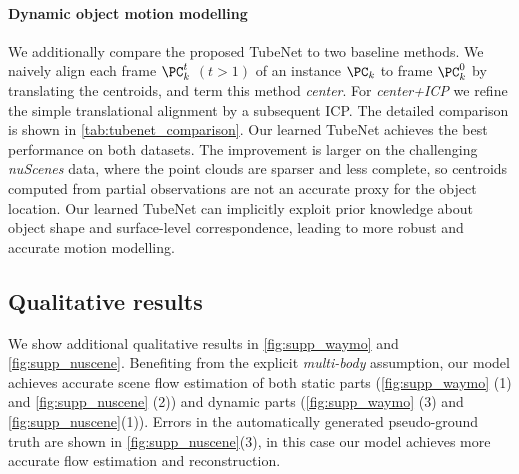 \paragraph{Dynamic object motion modelling}

We additionally compare the proposed TubeNet to two baseline methods. We naively align each frame $\PC_k^t$ $(t>1)$ of an instance $\PC_k$ to frame $\PC_k^0$ by %
translating the centroids, and term this method \textit{center}. For \textit{center+ICP} we refine the simple translational alignment by a subsequent ICP. The detailed comparison is shown in \cref{tab:tubenet_comparison}. Our learned TubeNet achieves the best performance on both datasets. The improvement is larger on the challenging \emph{nuScenes} data, where the point clouds are sparser and less complete, so centroids computed from partial observations are not an accurate proxy for the object location. Our learned TubeNet can implicitly exploit prior knowledge about object shape and surface-level correspondence, leading to more robust and accurate motion modelling. 

\subsection{Qualitative results}
\label{sec:supp_qual}
We show additional qualitative results in \cref{fig:supp_waymo} and \cref{fig:supp_nuscene}. Benefiting from the explicit \textit{multi-body} assumption, our model achieves accurate scene flow estimation of both static parts (\cref{fig:supp_waymo} (1) and \cref{fig:supp_nuscene} (2)) and dynamic parts (\cref{fig:supp_waymo} (3) and \cref{fig:supp_nuscene}(1)). Errors in the automatically generated pseudo-ground truth are shown in \cref{fig:supp_nuscene}(3), in this case our model achieves more accurate flow estimation and reconstruction.  



